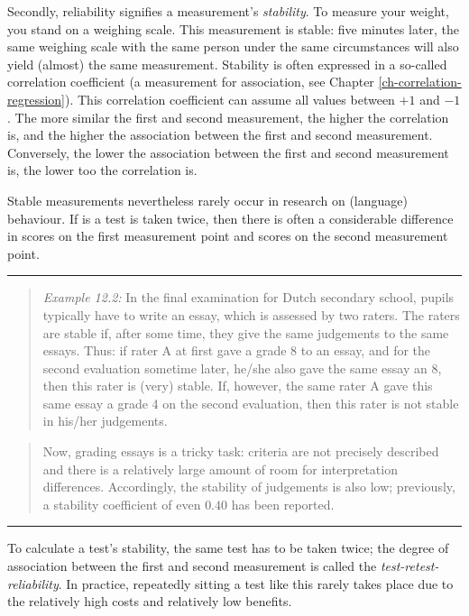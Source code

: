 \documentclass[
]{book}
\begin{document}
Secondly, reliability signifies a measurement's \emph{stability}.
To measure your weight, you stand on a weighing scale. This
measurement is stable: five minutes later, the same weighing scale with the same
person under the same circumstances will also yield (almost)
the same measurement. Stability is often expressed in a so-called
correlation coefficient (a measurement for association, see Chapter
\ref{ch-correlation-regression}). This correlation coefficient can assume all
values between \(+1\) and \(-1\). The more similar the first and second measurement,
the higher the correlation is, and the higher the association between the first and second
measurement. Conversely, the lower the association between the first and second
measurement is, the lower too the correlation is.

Stable measurements nevertheless rarely occur in research on
(language) behaviour. If is a test is taken twice, then there is often
a considerable difference in scores on the first measurement point
and scores on the second measurement point.

\begin{center}\rule{0.5\linewidth}{0.5pt}\end{center}

\begin{quote}
\emph{Example 12.2:}
In the final examination for Dutch secondary school, pupils typically have to write an essay, which is
assessed by two raters. The raters are stable if, after some time, they
give the same judgements to the same essays. Thus: if rater A at first gave a grade
8 to an essay, and for the second evaluation sometime later, he/she also gave the same
essay an 8, then this rater is (very) stable. If, however, the same
rater A gave this same essay a grade 4 on the second evaluation, then this
rater is not stable in his/her judgements.
\end{quote}

\begin{quote}
Now, grading essays is a tricky task: criteria are not precisely described
and there is a relatively large amount of room for
interpretation differences. Accordingly, the stability of judgements is also
low; previously, a stability coefficient of even \(0.40\) has
been reported.
\end{quote}

\begin{center}\rule{0.5\linewidth}{0.5pt}\end{center}

To calculate a test's stability, the same test has to be
taken twice; the degree of association between the first and
second measurement is called the \emph{test-retest-reliability}.
In practice, repeatedly sitting a test like this rarely takes place due to
the relatively high costs and relatively low benefits.
\end{document}
